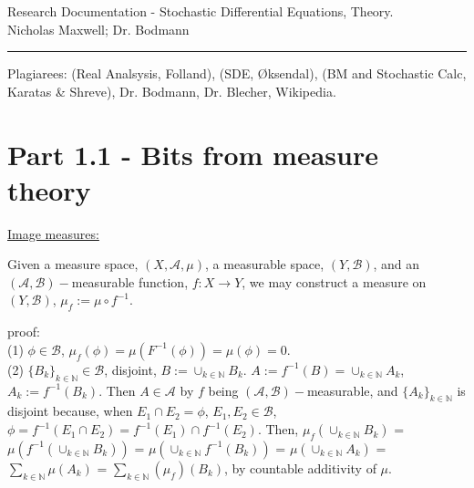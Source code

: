 \documentclass[12pt]{article}
\newcommand{\nats}[0] { \mathbb{N}}
\newcommand{\A}[0] { \mathcal{A} }
\newcommand{\B}[0] { \mathcal{B} }
\begin{document}
\begin{flushleft}
Research Documentation - Stochastic Differential Equations, Theory. \\
Nicholas Maxwell; Dr. Bodmann\\
\end{flushleft}

\begin{flushleft}
\addvspace{5pt} \hrule
\end{flushleft}	




	Plagiarees: (Real Analsysis, Folland), (SDE, \O ksendal), (BM and Stochastic Calc, Karatas \& Shreve), Dr. Bodmann, Dr. Blecher, Wikipedia.


\section*{Part 1.1 - Bits from measure theory }



\begin{flushleft}
\underline{Image measures:}
\end{flushleft}

\begin{flushleft}
Given a measure space, $(X,\A,\mu)$, a measurable space, $(Y,\B)$, and an $(\A,\B)-$measurable function, $f:X \rightarrow Y$, we may construct a measure on $(Y,\B)$,  $\mu_f := \mu \circ f^{-1}$.\\
\end{flushleft}


\noindent proof:\\

(1) $\phi \in \B$, $\mu_f (\phi) = \mu(F^{-1}(\phi)) = \mu(\phi) = 0$. \\

(2) $\{ B_k \}_{k \in \nats } \in \B $, disjoint, $B := \cup_{k \in \nats} B_k$. $A := f^{-1}(B) = \cup_{k \in \nats} A_k $, $A_k := f^{-1}(B_k)$. Then $A \in \A$ by $f$ being $(\A,\B)-$measurable, and $\{ A_k \}_{k \in \nats }$ is disjoint because, when $E_1 \cap E_2 = \phi$, $E_1, E_2 \in \B$, $ \phi = f^{-1}(E_1 \cap E_2) = f^{-1}(E_1) \cap f^{-1}(E_2)$. Then, $\mu_f ( \cup_{k \in \nats} B_k )$  = $\mu( f^{-1}( \cup_{k \in \nats} B_k ) )$ = $\mu( \cup_{k \in \nats} f^{-1}( B_k ) )$ = $\mu( \cup_{k \in \nats} A_k )$ = $ \sum_{k \in \nats } \mu( A_k ) $ = $ \sum_{k \in \nats } (\mu_f)( B_k ) $, by countable additivity of $\mu$.
\end{document}
